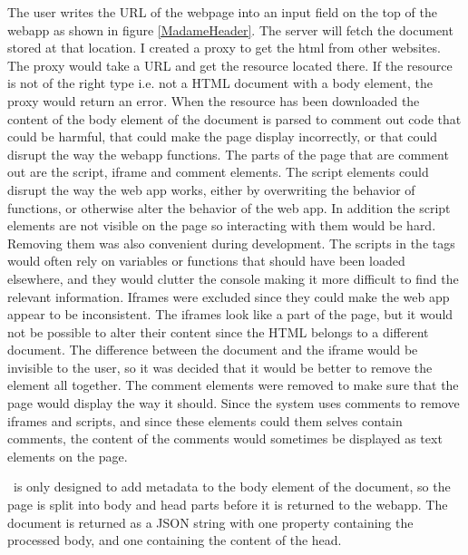 The user writes the URL of the webpage into an input field on the top of the webapp as shown in figure \ref{MadameHeader}.
The server will fetch the document stored at that location.
I created a proxy to get the html from other websites.
The proxy would take a URL and get the resource located there.
If the resource is not of the right type i.e. not a HTML document with a body element,
the proxy would return an error.
When the resource has been downloaded the content of the body element of the document is parsed to comment out code that
could be harmful, that could make the page display incorrectly, or that could disrupt the way the webapp functions.
The parts of the page that are comment out are the script, iframe and comment elements.
The script elements could disrupt the way the web app works, either by overwriting the behavior of functions,
or otherwise alter the behavior of the web app.
In addition the script elements are not visible on the page so interacting with them would be hard.
Removing them was also convenient during development.
The scripts in the tags would often rely on variables or functions that should have been loaded elsewhere,
and they would clutter the console making it more difficult to find the relevant information.
Iframes were excluded since they could make the web app appear to be inconsistent.
The iframes look like a part of the page,
but it would not be possible to alter their content since the HTML belongs to a different document.
The difference between the document and the iframe would be invisible to the user,
so it was decided that it would be better to remove the element all together.
The comment elements were removed to make sure that the page would display the way it should.
Since the system uses comments to remove iframes and scripts, and since these elements could them selves contain comments,
the content of the comments would sometimes be displayed as text elements on the page.

\Theartefact\ is only designed to add metadata to the body element of the document,
so the page is split into body and head parts before it is returned to the webapp.
The document is returned as a JSON string with one property containing the processed body,
and one containing the content of the head.


